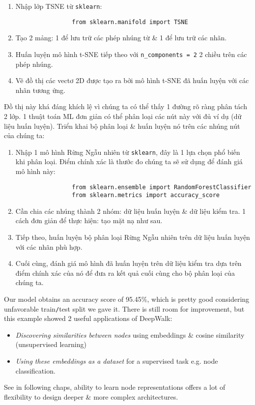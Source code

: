 \documentclass{article}
\begin{document}
\begin{itemize}
\begin{itemize}
        \begin{enumerate}
            \item Nhập lớp TSNE từ {\tt sklearn}:
            \begin{verbatim}
                from sklearn.manifold import TSNE
            \end{verbatim}
            \item Tạo 2 mảng: 1 để lưu trữ các phép nhúng từ \& 1 để lưu trữ các nhãn.
            \item Huấn luyện mô hình t-SNE tiếp theo với \verb|n_components = 2| 2 chiều trên các phép nhúng.
            \item Vẽ đồ thị các vectơ 2D được tạo ra bởi mô hình t-SNE đã huấn luyện với các nhãn tương ứng.
        \end{enumerate}
        Đồ thị này khá đáng khích lệ vì chúng ta có thể thấy 1 đường rõ ràng phân tách 2 lớp. 1 thuật toán ML đơn giản có thể phân loại các nút này với đủ ví dụ (dữ liệu huấn luyện). Triển khai bộ phân loại \& huấn luyện nó trên các nhúng nút của chúng ta:
        \begin{enumerate}
            \item Nhập 1 mô hình Rừng Ngẫu nhiên từ {\tt sklearn}, đây là 1 lựa chọn phổ biến khi phân loại. Điểm chính xác là thước đo chúng ta sẽ sử dụng để đánh giá mô hình này:
            \begin{verbatim}
                from sklearn.ensemble import RandomForestClassifier
                from sklearn.metrics import accuracy_score
            \end{verbatim}
            \item Cần chia các nhúng thành 2 nhóm: dữ liệu huấn luyện \& dữ liệu kiểm tra. 1 cách đơn giản để thực hiện: tạo mặt nạ như sau.
            \item Tiếp theo, huấn luyện bộ phân loại Rừng Ngẫu nhiên trên dữ liệu huấn luyện với các nhãn phù hợp.
            \item Cuối cùng, đánh giá mô hình đã huấn luyện trên dữ liệu kiểm tra dựa trên điểm chính xác của nó để đưa ra kết quả cuối cùng cho bộ phân loại của chúng ta.
        \end{enumerate}
        Our model obtains an accuracy score of 95.45\%, which is pretty good considering unfavorable train{\tt/}test split we gave it. There is still room for improvement, but this example showed 2 useful applications of DeepWalk:
        \begin{itemize}
            \item {\it Discovering similarities between nodes} using embeddings \& cosine similarity (unsupervised learning)
            \item {\it Using these embeddings as a dataset} for a supervised task e.g. node classification.
        \end{itemize}
        See in following chaps, ability to learn node representations offers a lot of flexibility to design deeper \& more complex architectures.


\end{itemize}
\end{itemize}
\end{document}
